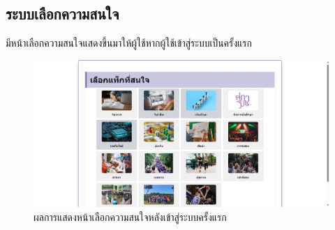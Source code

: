 \subsection{ระบบเลือกความสนใจ}
มีหน้าเลือกความสนใจแสดงขึ้นมาให้ผู้ใช้หากผู้ใช้เข้าสู่ระบบเป็นครั้งแรก
\begin{figure}[h] 
    \begin{center}
        \includegraphics[width=0.6\linewidth]{image/web/choose.jpeg}
    \end{center}
    \caption{ผลการแสดงหน้าเลือกความสนใจหลังเข้าสู่ระบบครั้งแรก}
    \label{fig:choose}
\end{figure}

\newpage

